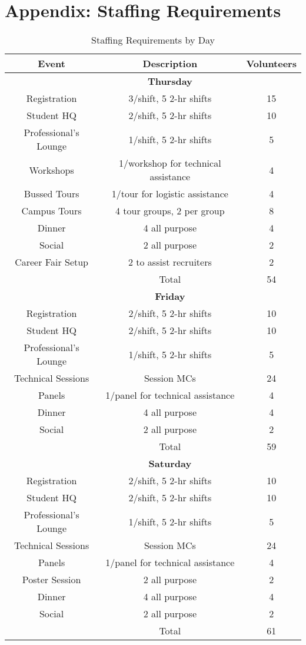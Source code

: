 \section{Appendix: Staffing Requirements}
\label{appendix:staff}

\begin{table}[H]
	\caption{Staffing Requirements by Day}
	\label{table:staff}
	\centering
	\begin{tabular}{ccc}
	\hline\hline
	\textbf{Event} & \textbf{Description} & \textbf{Volunteers} \\
	\hline\hline
	& \textbf{Thursday} & \\
	\hline
	Registration & 3/shift, 5 2-hr shifts & 15\\
	Student HQ & 2/shift, 5 2-hr shifts & 10\\
	Professional's Lounge & 1/shift, 5 2-hr shifts & 5\\
	Workshops & 1/workshop for technical assistance & 4\\
	Bussed Tours & 1/tour for logistic assistance & 4\\
	Campus Tours & 4 tour groups, 2 per group & 8\\
	Dinner & 4 all purpose & 4\\
	Social & 2 all purpose & 2\\
	Career Fair Setup & 2 to assist recruiters & 2 \\
	\hline	
	& Total & 54\\
	\hline
	& \textbf{Friday} & \\
	\hline
	Registration & 2/shift, 5 2-hr shifts & 10\\
	Student HQ & 2/shift, 5 2-hr shifts & 10\\
	Professional's Lounge & 1/shift, 5 2-hr shifts & 5\\
	Technical Sessions & Session MCs & 24\\
	Panels & 1/panel for technical assistance & 4\\
	Dinner & 4 all purpose & 4\\
	Social & 2 all purpose & 2\\
	\hline
	& Total & 59\\
	\hline
	& \textbf{Saturday} & \\
	\hline
	Registration & 2/shift, 5 2-hr shifts & 10\\
	Student HQ & 2/shift, 5 2-hr shifts & 10\\
	Professional's Lounge & 1/shift, 5 2-hr shifts & 5\\
	Technical Sessions & Session MCs & 24\\
	Panels & 1/panel for technical assistance & 4\\
 	Poster Session & 2 all purpose & 2\\
	Dinner & 4 all purpose & 4\\
	Social & 2 all purpose & 2\\
	\hline
	 & Total & 61\\
	\hline
	\end{tabular}
\end{table}